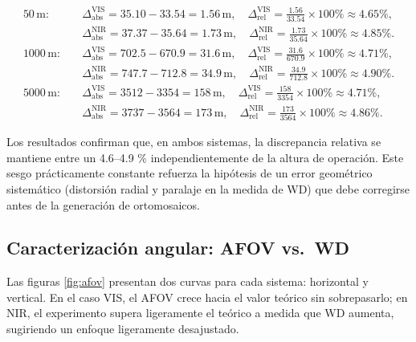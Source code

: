      \begin{align*}
     50\,\mathrm{m}:&\quad
     \Delta_{\mathrm{abs}}^{\mathrm{VIS}} = 35.10 - 33.54 = 1.56\,\mathrm{m}, 
     \quad
     \Delta_{\mathrm{rel}}^{\mathrm{VIS}} = \frac{1.56}{33.54}\times100\%\approx4.65\%,\\
     &\quad
     \Delta_{\mathrm{abs}}^{\mathrm{NIR}} = 37.37 - 35.64 = 1.73\,\mathrm{m}, 
     \quad
     \Delta_{\mathrm{rel}}^{\mathrm{NIR}} = \frac{1.73}{35.64}\times100\%\approx4.85\%.\\[6pt]
     1000\,\mathrm{m}:&\quad
     \Delta_{\mathrm{abs}}^{\mathrm{VIS}} = 702.5 - 670.9 = 31.6\,\mathrm{m}, 
     \quad
     \Delta_{\mathrm{rel}}^{\mathrm{VIS}} = \frac{31.6}{670.9}\times100\%\approx4.71\%,\\
     &\quad
     \Delta_{\mathrm{abs}}^{\mathrm{NIR}} = 747.7 - 712.8 = 34.9\,\mathrm{m}, 
     \quad
     \Delta_{\mathrm{rel}}^{\mathrm{NIR}} = \frac{34.9}{712.8}\times100\%\approx4.90\%.\\[6pt]
     5000\,\mathrm{m}:&\quad
     \Delta_{\mathrm{abs}}^{\mathrm{VIS}} = 3512 - 3354 = 158\,\mathrm{m}, 
     \quad
     \Delta_{\mathrm{rel}}^{\mathrm{VIS}} = \frac{158}{3354}\times100\%\approx4.71\%,\\
     &\quad
     \Delta_{\mathrm{abs}}^{\mathrm{NIR}} = 3737 - 3564 = 173\,\mathrm{m}, 
     \quad
     \Delta_{\mathrm{rel}}^{\mathrm{NIR}} = \frac{173}{3564}\times100\%\approx4.86\%.
     \end{align*}
 
     
     Los resultados confirman que, en ambos sistemas, la discrepancia relativa se mantiene entre un 4.6–4.9 \% independientemente de la altura de operación. Este sesgo prácticamente constante refuerza la hipótesis de un error geométrico sistemático (distorsión radial y paralaje en la medida de WD) que debe corregirse antes de la generación de ortomosaicos. 
     
     
     \subsection{Caracterización angular: AFOV vs.\ WD}
     Las figuras \ref{fig:afov} presentan dos curvas para cada sistema: horizontal y vertical. En el caso VIS, el AFOV crece hacia el valor teórico sin sobrepasarlo; en NIR, el experimento supera ligeramente el teórico a medida que WD aumenta, sugiriendo un enfoque ligeramente desajustado. \\
 
